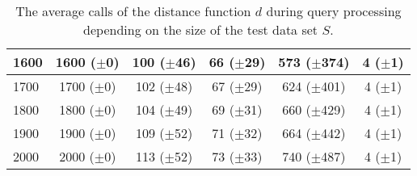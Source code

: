 \documentclass[runningheads,a4paper]{llncs}
\begin{document}
\begin{table}[H]
\begin{center}
{\begin{tabular}{| l | c | c | c | c | c |}
			1600 & 1600 ($\pm$0) & 100 ($\pm$46) & 66 ($\pm$29) & 573 ($\pm$374) & 4 ($\pm$1) \\ \hline
			1700 & 1700 ($\pm$0) & 102 ($\pm$48) & 67 ($\pm$29) & 624 ($\pm$401) & 4 ($\pm$1) \\ \hline
			1800 & 1800 ($\pm$0) & 104 ($\pm$49) & 69 ($\pm$31) & 660 ($\pm$429) & 4 ($\pm$1) \\ \hline
			1900 & 1900 ($\pm$0) & 109 ($\pm$52) & 71 ($\pm$32) & 664 ($\pm$442) & 4 ($\pm$1) \\ \hline
			2000 & 2000 ($\pm$0) & 113 ($\pm$52) & 73 ($\pm$33) & 740 ($\pm$487) & 4 ($\pm$1) \\ \hline
		\end{tabular}}
	\end{center}
	\caption{The average calls of the distance function $d$ during query processing depending on the size of the test
		data set $S$.}
	\label{tab:queryprocessing}
\end{table}
\end{document}
